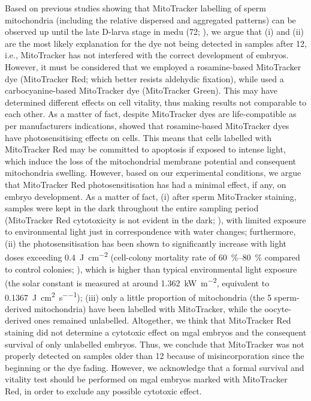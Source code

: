 Based on previous studies showing that MitoTracker labelling of sperm mitochondria (including the relative dispersed and aggregated patterns) can be observed up until the late D-larva stage in \gls{medu} (\qty{72}{\hpf}; ), we argue that (i) and (ii) are the most likely explanation for the dye not being detected in samples after \qty{12}{\hpf}, i.e., MitoTracker has not interfered with the correct development of embryos. However, it must be considered that we employed a rosamine-based MitoTracker dye (MitoTracker Red; which better resists aldehydic fixation), while  used a carbocyanine-based MitoTracker dye (MitoTracker Green). This may have determined different effects on cell vitality, thus making results not comparable to each other. As a matter of fact, despite MitoTracker dyes are life-compatible as per manufacturer\curlyapostrophe s indications,  showed that rosamine-based MitoTracker dyes have photosensitising effects on cells. This means that cells labelled with MitoTracker Red may be committed to apoptosis if exposed to intense light, which induce the loss of the mitochondrial membrane potential and consequent mitochondria swelling. However, based on our experimental conditions, we argue that MitoTracker Red photosensitisation has had a minimal effect, if any, on embryo development. As a matter of fact, (i) after sperm MitoTracker staining, samples were kept in the dark throughout the entire sampling period (MitoTracker Red cytotoxicity is not evident in the dark; ), with limited exposure to environmental light just in correspondence with water changes; furthermore, (ii) the photosensitisation has been shown to significantly increase with light doses exceeding \qty{0.4}{\J\per\square\cm} (cell-colony mortality rate of \qtyrange{60}{80}{\percent} compared to control colonies; ), which is higher than typical environmental light exposure (the solar constant is measured at around \qty{1.362}{\kW\per\square\m}, equivalent to \qty{0.1367}{\J\per\square\cm\per\s}); (iii) only a little proportion of mitochondria (the 5 sperm-derived mitochondria) have been labelled with MitoTracker, while the oocyte-derived ones remained unlabelled. Altogether, we think that MitoTracker Red staining did not determine a cytotoxic effect on \gls{mgal} embryos and the consequent survival of only unlabelled embryos. Thus, we conclude that MitoTracker was not properly detected on samples older than \qty{12}{\hpf} because of misincorporation since the beginning or the dye fading. However, we acknowledge that a formal survival and vitality test should be performed on \gls{mgal} embryos marked with MitoTracker Red, in order to exclude any possible cytotoxic effect.

